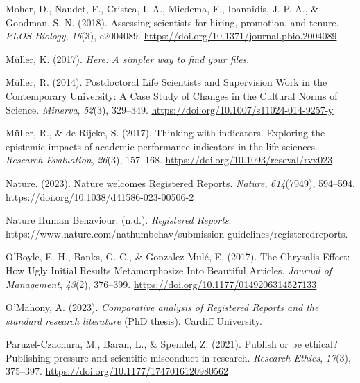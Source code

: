 \documentclass[
  ,man,mask,floatsintext]{apa6}
\newlength{\cslhangindent}
\newlength{\cslentryspacingunit} %
\newenvironment{CSLReferences}[2] %
 {%
  \setlength{\parindent}{0pt}
  \ifodd #1
  \let\oldpar\par
  \def\par{\hangindent=\cslhangindent\oldpar}
  \fi
  \setlength{\parskip}{#2\cslentryspacingunit}
 }%
 {}
\begin{document}
\begin{CSLReferences}{1}{0}
\leavevmode{}%
Moher, D., Naudet, F., Cristea, I. A., Miedema, F., Ioannidis, J. P. A., \& Goodman, S. N. (2018). Assessing scientists for hiring, promotion, and tenure. \emph{PLOS Biology}, \emph{16}(3), e2004089. \url{https://doi.org/10.1371/journal.pbio.2004089}

\leavevmode{}%
Müller, K. (2017). \emph{Here: {A} simpler way to find your files}.

\leavevmode{}%
Müller, R. (2014). Postdoctoral {Life Scientists} and {Supervision Work} in the {Contemporary University}: {A Case Study} of {Changes} in the {Cultural Norms} of {Science}. \emph{Minerva}, \emph{52}(3), 329--349. \url{https://doi.org/10.1007/s11024-014-9257-y}

\leavevmode{}%
Müller, R., \& de Rijcke, S. (2017). Thinking with indicators. {Exploring} the epistemic impacts of academic performance indicators in the life sciences. \emph{Research Evaluation}, \emph{26}(3), 157--168. \url{https://doi.org/10.1093/reseval/rvx023}

\leavevmode{}%
Nature. (2023). Nature welcomes {Registered Reports}. \emph{Nature}, \emph{614}(7949), 594--594. \url{https://doi.org/10.1038/d41586-023-00506-2}

\leavevmode{}%
Nature Human Behaviour. (n.d.). \emph{Registered {Reports}}. https://www.nature.com/nathumbehav/submission-guidelines/registeredreports.

\leavevmode{}%
O'Boyle, E. H., Banks, G. C., \& Gonzalez-Mulé, E. (2017). The {Chrysalis Effect}: {How Ugly Initial Results Metamorphosize Into Beautiful Articles}. \emph{Journal of Management}, \emph{43}(2), 376--399. \url{https://doi.org/10.1177/0149206314527133}

\leavevmode{}%
O'Mahony, A. (2023). \emph{Comparative analysis of {Registered Reports} and the standard research literature} (PhD thesis). Cardiff University.

\leavevmode{}%
Paruzel-Czachura, M., Baran, L., \& Spendel, Z. (2021). Publish or be ethical? {Publishing} pressure and scientific misconduct in research. \emph{Research Ethics}, \emph{17}(3), 375--397. \url{https://doi.org/10.1177/1747016120980562}


\end{CSLReferences}
\end{document}
